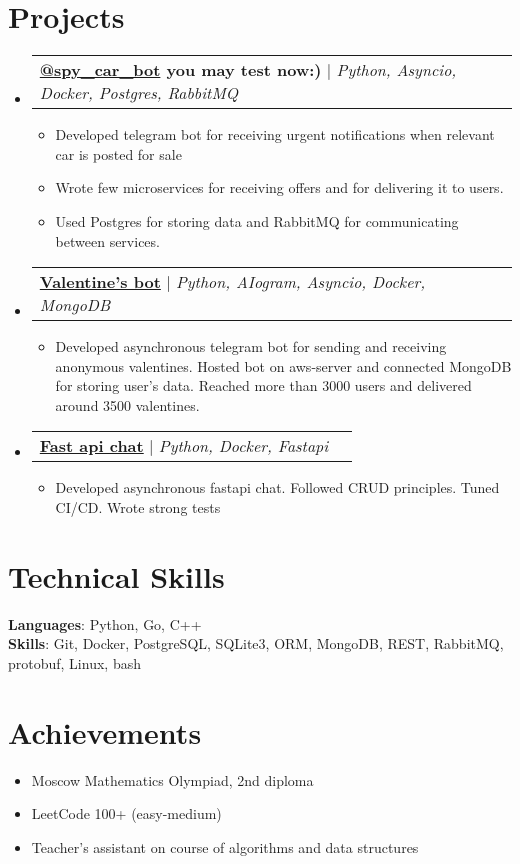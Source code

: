 \documentclass[letterpaper,11pt]{article}
\makeatletter
\newcommand{\resumeItem}[1]{
  \item\small{
    {#1 \vspace{-2pt}}
  }
}
\newcommand{\resumeProjectHeading}[2]{
    \item
    \begin{tabular*}{0.97\textwidth}{l@{\extracolsep{\fill}}r}
      \small#1 & #2 \\
    \end{tabular*}\vspace{-7pt}
}
\newcommand{\resumeSubHeadingListStart}{\begin{itemize}[leftmargin=0.15in, label={}]}
\newcommand{\resumeSubHeadingListEnd}{\end{itemize}}
\newcommand{\resumeItemListStart}{\begin{itemize}}
\newcommand{\resumeItemListEnd}{\end{itemize}\vspace{-5pt}}
\makeatother
\begin{document}
\section{Projects}
    \resumeSubHeadingListStart
     \resumeProjectHeading
    {\textbf{\href{https://t.me/spy_car_bot}{\color{blue}@spy\_car\_bot} you may test now:) } $|$ \emph{Python, Asyncio, Docker, Postgres, RabbitMQ}}{}
    \resumeItemListStart
    \resumeItem{\normalsize{Developed telegram bot for receiving urgent notifications when relevant car is posted for sale}}
    \resumeItem{\normalsize{Wrote few microservices for receiving offers and for delivering it to users.}}
    \resumeItem{\normalsize{Used Postgres for storing data and RabbitMQ for communicating between services.}}
    \resumeItemListEnd
        \resumeProjectHeading
    {\textbf{\href{https://github.com/yasamprom/valentine}{\color{blue}Valentine's bot}} $|$ \emph{Python, AIogram, Asyncio, Docker, MongoDB}}{}
          \resumeItemListStart
            \resumeItem{\normalsize{Developed asynchronous telegram bot for sending and receiving anonymous valentines. Hosted bot on aws-server and connected MongoDB for storing user's data. Reached more than 3000 users and delivered around 3500 valentines.}}
        \resumeItemListEnd

    \resumeProjectHeading
{\textbf{\href{https://github.com/yasamprom/fastapichat}{\color{blue}Fast api chat}} $|$ \emph{Python, Docker, Fastapi}}{}
        \resumeItemListStart
          \resumeItem{\normalsize{Developed asynchronous fastapi chat. Followed CRUD principles. Tuned CI/CD. Wrote strong tests}}
        \resumeItemListEnd


    \resumeSubHeadingListEnd


\section{Technical Skills}
 \begin{itemize}[leftmargin=0.15in, label={}]
    \small{\item{
     \textbf{Languages}{: Python, Go, C++} \\
     \textbf{Skills}{: Git, Docker, PostgreSQL, SQLite3, ORM, MongoDB, REST, RabbitMQ, protobuf, Linux, bash} \\
    }}
 \end{itemize}

\section{Achievements}
\resumeItemListStart
\resumeItem{\normalsize{Moscow Mathematics
		Olympiad, 2nd diploma}}
\resumeItem{\normalsize{LeetCode 100+ (easy-medium)}}
\resumeItem{\normalsize{Teacher's assistant on course of algorithms and data structures}}
\resumeItemListEnd





\end{document}

